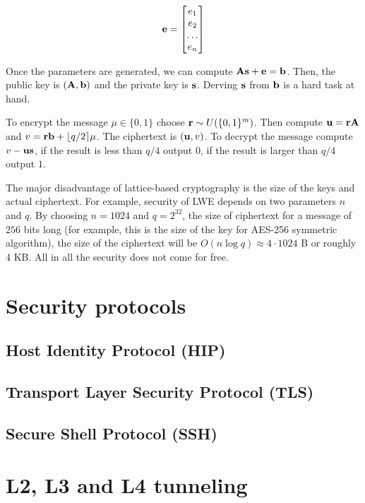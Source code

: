 \begin{equation}
    {\bf e}=\begin{bmatrix}
        e_{1} \\
        e_{2} \\
        \dots \\
        e_{n} 
    \end{bmatrix}
\end{equation}

Once the parameters are generated, we can compute ${\bf As}+{\bf e} = {\bf b}$. Then, the public 
key is $({\bf A, b})$ and the private key is ${\bf s}$. Derving ${\bf s}$ from ${\bf b}$ is a hard 
task at hand.

To encrypt the message $\mu \in \{0, 1\}$ choose ${\bf r} \sim U(\{0, 1\}^m)$. Then compute ${\bf u}={\bf rA}$ and 
$v={\bf rb}+\lfloor q/2 \rceil \mu$. The ciphertext is $({\bf u}, v)$. To decrypt the message 
compute $v - \bf{u s}$, if the result is less than $q/4$ output $0$, if the result
is larger than $q/4$ output $1$. 

The major disadvantage of lattice-based cryptography is the size of the keys and actual ciphertext. For example,
security of LWE depends on two parameters $n$ and $q$. By choosing $n=1024$ and $q=2^{32}$, the size of ciphertext
for a message of $256$ bits long (for example, this is the size of the key for AES-256 symmetric algorithm), 
the size of the ciphertext will be $O(n\log q) \approx 4\cdot 1024$ B or roughly $4$ KB. All in all 
the security does not come for free.

\section{Security protocols}

\subsection{Host Identity Protocol (HIP)}

\subsection{Transport Layer Security Protocol (TLS)}

\subsection{Secure Shell Protocol (SSH)}

\section{L2, L3 and L4 tunneling}

